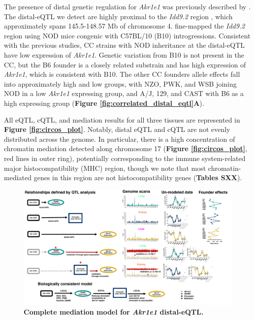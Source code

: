 The presence of distal genetic regulation for \textit{Akr1e1} was previously described by \cite{HamiltonWilliams2013}. The distal-eQTL we detect are highly proximal to the \textit{Idd9.2} region \citep{HamiltonWilliams2010}, which approximately spans 145.5-148.57 Mb of chromosome 4. \cite{HamiltonWilliams2013} fine-mapped the \textit{Idd9.2} region using NOD mice congenic with C57BL/10 (B10) introgressions. Consistent with the previous studies, CC strains with NOD inheritance at the distal-eQTL have low expression of \textit{Akr1e1}. Genetic variation from B10 is not present in the CC, but the B6 founder is a closely related substrain and has high expression of \textit{Akr1e1}, which is consistent with B10. The other CC founders allele effects fall into approximately high and low groups, with NZO, PWK, and WSB joining NOD in a low \textit{Akr1e1} expressing group, and A/J, 129, and CAST with B6 as a high expressing group (\textbf{Figure \ref{fig:correlated_distal_eqtl}A}). 

All eQTL, cQTL, and mediation results for all three tissues are represented in \textbf{Figure \ref{fig:circos_plot}}. Notably, distal eQTL and cQTL are not evenly distributed across the genome. In particular, there is a high concentration of chromatin mediation detected along chromosome 17 (\textbf{Figure \ref{fig:circos_plot}}, red lines in outer ring), potentially corresponding to the immune system-related major histocompatibility (MHC) region, though we note that most chromatin-mediated genes in this region are not histocompatibility genes (\textbf{Tables SXX}).

\begin{figure}[hp]
\renewcommand{\familydefault}{\sfdefault}\normalfont
\centering
\includegraphics[width=\textwidth, trim={0in 0.1in 0in 0in}, clip]{figs/akr1e1_full_model.pdf}
\caption{\textbf{Complete mediation model for \textit{Akr1e1} distal-eQTL.} \label{fig:akr1e1_full_model.pdf}}
\end{figure}


